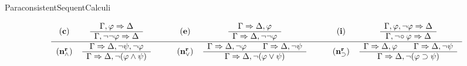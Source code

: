 \calculusAcronym{}




\maketitle

\begin{entry}{ParaconsistentSequentCalculi}

\newcommand{\G}{{\bf G}}
\newcommand{\GBK}{{\G_{\bf BK}}}
\newcommand{\name}[1]{{\bf (#1)}}
\newcommand{\vfi}{\varphi}
\newcommand{\su}{\supset}
\newcommand{\ssrul}[2]{\begin{array}{c}#1\\ \hline #2\end{array}}
\newcommand{\ddrul}[3]{\begin{array}{c}#1\hspace{2em}#2\\
\hline #3\end{array}}
\newcommand{\Ga}{\Gamma}
\newcommand{\De}{\Delta}
\newcommand{\Ra}{\Rightarrow}
\newcommand{\srul}[4]{\ssrul{\Ga #1\Ra\De #2}{\Ga
#3\Ra\De #4}}
\newcommand{\drul}[6]{\ddrul{\Ga #1\Ra\De #2}{\Ga #3\Ra\De #4}{\Ga
#5\Ra\De #6}}
\newcommand{\w}{\wedge}

\begin{calculus}

\renewcommand*{\arraystretch}{1.5}
\footnotesize
\[\begin{tabular}{ccc@{\hspace{2em}}ccc@{\hspace{2em}}cc}%
%
${\name{c}}$ &     $\srul{,\vfi}{}{,\neg\neg\vfi}{}$  &&
${\name{e}}$    & $\srul{}{,\vfi}{}{,\neg\neg\vfi}$  &&
${\name{i}}$ &    $\srul{,\vfi,\neg\vfi}{}{,\neg\! \circ \vfi}{}$ \\\hline
${\name{n^r_\w}}$ &
$\srul{}{,\neg\psi,\neg\vfi}{}{,\neg (\vfi\w\psi)}$ &&
${\name{n^r_\vee}}$ &       $\drul{}{,\neg\vfi}{}{,\neg\psi}{}{,\neg(\vfi\vee\psi)}$
&&
${\name{n^r_\su}}$ &   $\drul{}{,\vfi}{}{,\neg\psi}{}{,\neg(\vfi\su\psi)}$
 \\


\end{tabular}\]
\end{calculus}
\end{entry}
